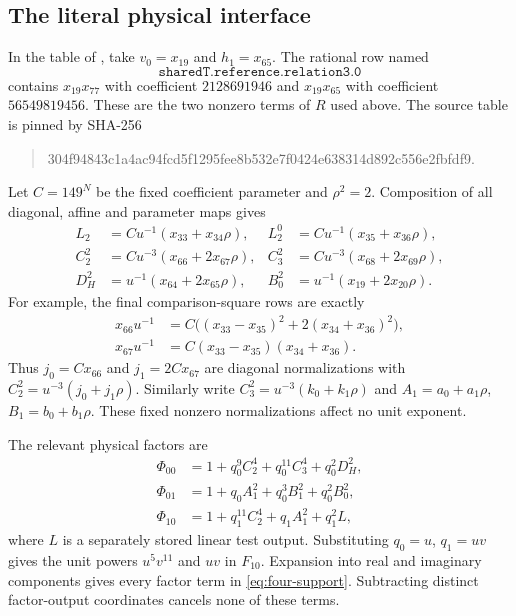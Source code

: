 \documentclass[11pt,a4paper]{article}
\begin{document}
\subsection{The literal physical interface}

In the table of \cite{Quartic}, take $v_0=x_{19}$ and $h_1=x_{65}$.
The rational row named
\[
\texttt{sharedT.reference.relation3.0}
\]
contains $x_{19}x_{77}$ with coefficient $2128691946$ and
$x_{19}x_{65}$ with coefficient $56549819456$. These are the two
nonzero terms of $R$ used above. The source table is pinned by
SHA-256
\begin{quote}\small\ttfamily\raggedright
304f94843c1a4ac94fcd5f1295fee8b532e7f0424e638314d892c556e2fbfdf9.
\end{quote}

Let $C=149^N$ be the fixed coefficient parameter and $\rho^2=2$.
Composition of all diagonal, affine and parameter maps gives
\[
\begin{aligned}
L_2&=Cu^{-1}(x_{33}+x_{34}\rho),&
L_2^0&=Cu^{-1}(x_{35}+x_{36}\rho),\\
C_2^2&=Cu^{-3}(x_{66}+2x_{67}\rho),&
C_3^2&=Cu^{-3}(x_{68}+2x_{69}\rho),\\
D_H^2&=u^{-1}(x_{64}+2x_{65}\rho),&
B_0^2&=u^{-1}(x_{19}+2x_{20}\rho).
\end{aligned}
\]
For example, the final comparison-square rows are exactly
\[
\begin{aligned}
x_{66}u^{-1}
 &=C\bigl((x_{33}-x_{35})^2+2(x_{34}+x_{36})^2\bigr),\\
x_{67}u^{-1}
 &=C(x_{33}-x_{35})(x_{34}+x_{36}).
\end{aligned}
\]
Thus $j_0=Cx_{66}$ and $j_1=2Cx_{67}$ are diagonal
normalizations with $C_2^2=u^{-3}(j_0+j_1\rho)$.
Similarly write $C_3^2=u^{-3}(k_0+k_1\rho)$ and
$A_1=a_0+a_1\rho$, $B_1=b_0+b_1\rho$. These fixed nonzero
normalizations affect no unit exponent.

The relevant physical factors are
\[
\begin{aligned}
\Phi_{00}&=1+q_0^9C_2^4+q_0^{11}C_3^4+q_0^2D_H^2,\\
\Phi_{01}&=1+q_0A_1^2+q_0^3B_1^2+q_0^2B_0^2,\\
\Phi_{10}&=1+q_1^{11}C_2^4+q_1A_1^2+q_1^2L,
\end{aligned}
\]
where $L$ is a separately stored linear test output. Substituting
$q_0=u$, $q_1=uv$ gives the unit powers $u^5v^{11}$ and $uv$
in $F_{10}$. Expansion into real and imaginary components gives
every factor term in \eqref{eq:four-support}. Subtracting distinct
factor-output coordinates cancels none of these terms.
\end{document}
